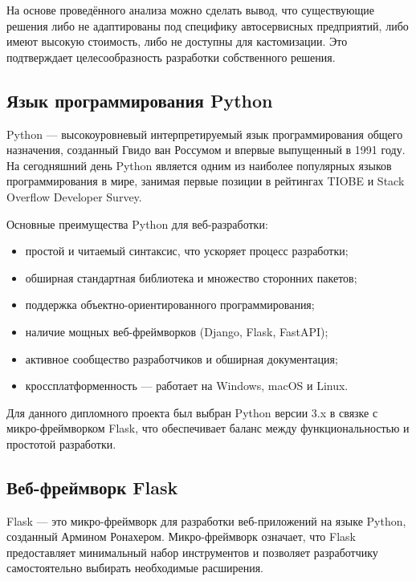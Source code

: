\documentclass[14pt,a4paper,oneside]{extarticle}
\begin{document}
На основе проведённого анализа можно сделать вывод, что существующие решения либо не адаптированы под специфику автосервисных предприятий, либо имеют высокую стоимость, либо не доступны для кастомизации. Это подтверждает целесообразность разработки собственного решения.

\subsection{Язык программирования Python}

Python --- высокоуровневый интерпретируемый язык программирования общего назначения, созданный Гвидо ван Россумом и впервые выпущенный в 1991 году. На сегодняшний день Python является одним из наиболее популярных языков программирования в мире, занимая первые позиции в рейтингах TIOBE и Stack Overflow Developer Survey.

Основные преимущества Python для веб-разработки:
\begin{itemize}[leftmargin=2cm]
    \item простой и читаемый синтаксис, что ускоряет процесс разработки;
    \item обширная стандартная библиотека и множество сторонних пакетов;
    \item поддержка объектно-ориентированного программирования;
    \item наличие мощных веб-фреймворков (Django, Flask, FastAPI);
    \item активное сообщество разработчиков и обширная документация;
    \item кроссплатформенность --- работает на Windows, macOS и Linux.
\end{itemize}

Для данного дипломного проекта был выбран Python версии 3.x в связке с микро-фреймворком Flask, что обеспечивает баланс между функциональностью и простотой разработки.

\subsection{Веб-фреймворк Flask}

Flask --- это микро-фреймворк для разработки веб-приложений на языке Python, созданный Армином Ронахером. Микро-фреймворк означает, что Flask предоставляет минимальный набор инструментов и позволяет разработчику самостоятельно выбирать необходимые расширения.
\end{document}
